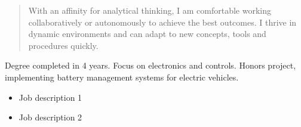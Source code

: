 \documentclass[9pt,a4paper,ragged2e,withhyper]{altacv}
\begin{document}
\begin{paracol}{2}


  \begin{quote}
    With an affinity for analytical thinking, I am comfortable working collaboratively or autonomously to achieve the best outcomes. I thrive in dynamic environments and can adapt to new concepts, tools and procedures quickly.
  \end{quote}



  \divider\smallskip


  \divider\smallskip



  \divider


  \divider


  \medskip



  Degree completed in 4 years. Focus on electronics and controls. Honors
  project, implementing battery management systems for electric
  vehicles.

  \divider



  \divider


  \switchcolumn


  \begin{itemize}
    \item Job description 1
    \item Job description 2
  \end{itemize}


\end{paracol}
\end{document}
